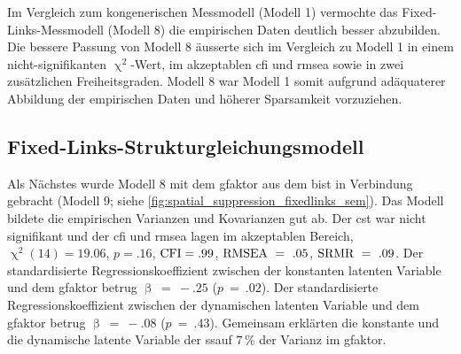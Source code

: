 \documentclass[11pt, twoside, a4paper]{book}		%
\begin{document}
Im Vergleich zum kongenerischen Messmodell (Modell 1) vermochte das Fixed-Links-Messmodell (Modell 8) die empirischen Daten deutlich besser abzubilden. Die bessere Passung von Modell 8 äusserte sich im Vergleich zu Modell 1 in einem nicht-signifikanten $\upchi^2$-Wert, im akzeptablen \gls{cfi} und \gls{rmsea} sowie in zwei zusätzlichen Freiheitsgraden. Modell 8 war Modell 1 somit aufgrund adäquaterer Abbildung der empirischen Daten und höherer Sparsamkeit vorzuziehen.



\subsection{Fixed-Links-Strukturgleichungsmodell}

Als Nächstes wurde Modell 8 mit dem \gls{gfaktor} aus dem \gls{bist} in Verbindung gebracht (Modell 9; siehe \autoref{fig:spatial_suppression_fixedlinks_sem}).
Das Modell bildete die empirischen Varianzen und Kovarianzen gut ab. Der \gls{cst} war nicht signifikant und der \gls{cfi} und \gls{rmsea} lagen im akzeptablen Bereich, $\upchi^2(14)=19.06$, $p=.16$, $\textnormal{CFI}=.99$, $\textnormal{RMSEA}~=~.05$, $\textnormal{SRMR}~=~.09$. 
Der standardisierte Regressionskoeffizient zwischen der konstanten latenten Variable und dem \gls{gfaktor} betrug $\upbeta~=~-.25$ ($p~=~.02$). Der standardisierte Regressionskoeffizient zwischen der dynamischen latenten Variable und dem \gls{gfaktor} betrug $\upbeta~=~-.08$ ($p~=~.43$).
Gemeinsam erklärten die konstante und die dynamische latente Variable der \gls{ssauf} $7\,\%$ der Varianz im \gls{gfaktor}.
\end{document}
